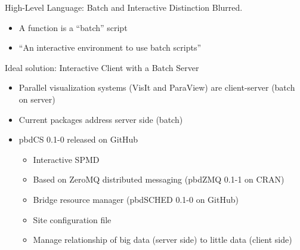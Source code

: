 \begin{frame}
  \begin{block}{High-Level Language: Batch and Interactive Distinction Blurred.}
    \begin{itemize}
    \item A function is a ``batch'' script
    \item \R ``An interactive environment to use batch scripts''
    \end{itemize}
  \end{block}
  \begin{block}{Ideal solution: Interactive Client with a Batch
      Server}
    \begin{itemize}
    \item Parallel visualization systems (VisIt and ParaView) are
      client-server (batch on server)
    \item Current \pbdR packages address server side (batch)
    \item pbdCS 0.1-0 released on GitHub
      \begin{itemize}
      \item Interactive SPMD
      \item Based on ZeroMQ distributed messaging (pbdZMQ 0.1-1 on CRAN)
      \item Bridge resource manager (pbdSCHED 0.1-0 on GitHub)
      \item Site configuration file
      \item Manage relationship of big data (server side) to little
        data (client side)
      \end{itemize}
    \end{itemize}
  \end{block}
\end{frame}
